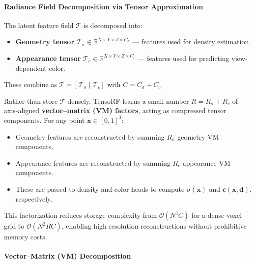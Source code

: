\begin{enrichment}
\begin{enrichment}
    \paragraph{Radiance Field Decomposition via Tensor Approximation}
    \label{par:chapter23_tensorf_decomp}
    
    The latent feature field \(\mathcal{T}\) is decomposed into:
    \begin{itemize}
        \item \textbf{Geometry tensor} \( \mathcal{T}_\sigma \in \mathbb{R}^{X \times Y \times Z \times C_\sigma} \) — features used for density estimation.
        \item \textbf{Appearance tensor} \( \mathcal{T}_c \in \mathbb{R}^{X \times Y \times Z \times C_c} \) — features used for predicting view-dependent color.
    \end{itemize}
    These combine as \(\mathcal{T} = [\mathcal{T}_\sigma \;|\; \mathcal{T}_c]\) with \(C = C_\sigma + C_c\).
    
    Rather than store \(\mathcal{T}\) densely, TensoRF learns a small number \(R = R_\sigma + R_c\) of axis-aligned \textbf{vector–matrix (VM) factors}, acting as compressed tensor components. For any point \(\mathbf{x} \in [0,1]^3\):
    \begin{itemize}
        \item Geometry features are reconstructed by summing \(R_\sigma\) geometry VM components.
        \item Appearance features are reconstructed by summing \(R_c\) appearance VM components.
        \item These are passed to density and color heads to compute \(\sigma(\mathbf{x})\) and \(\mathbf{c}(\mathbf{x}, \mathbf{d})\), respectively.
    \end{itemize}
    
    This factorization reduces storage complexity from \(\mathcal{O}(N^3 C)\) for a dense voxel grid to \(\mathcal{O}(N^2 R C)\), enabling high-resolution reconstructions without prohibitive memory costs.
        
    \paragraph{Vector--Matrix (VM) Decomposition}
    \label{par:chapter23_tensorf_vm}
    

\end{enrichment}
\end{enrichment}
